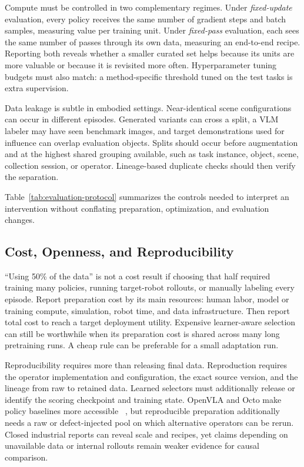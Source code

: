 Compute must be controlled in two complementary regimes.
Under \emph{fixed-update} evaluation, every policy receives the same number of gradient steps and batch samples, measuring value per training unit.
Under \emph{fixed-pass} evaluation, each sees the same number of passes through its own data, measuring an end-to-end recipe.
Reporting both reveals whether a smaller curated set helps because its units are more valuable or because it is revisited more often.
Hyperparameter tuning budgets must also match: a method-specific threshold tuned on the test tasks is extra supervision.

Data leakage is subtle in embodied settings.
Near-identical scene configurations can occur in different episodes.
Generated variants can cross a split, a VLM labeler may have seen benchmark images, and target demonstrations used for influence can overlap evaluation objects.
Splits should occur before augmentation and at the highest shared grouping available, such as task instance, object, scene, collection session, or operator.
Lineage-based duplicate checks should then verify the separation.

Table~\ref{tab:evaluation-protocol} summarizes the controls needed to interpret an intervention without conflating preparation, optimization, and evaluation changes.



\subsection{Cost, Openness, and Reproducibility}

``Using 50\% of the data'' is not a cost result if choosing that half required training many policies, running target-robot rollouts, or manually labeling every episode.
Report preparation cost by its main resources: human labor, model or training compute, simulation, robot time, and data infrastructure.
Then report total cost to reach a target deployment utility.
Expensive learner-aware selection can still be worthwhile when its preparation cost is shared across many long pretraining runs.
A cheap rule can be preferable for a small adaptation run.

Reproducibility requires more than releasing final data.
Reproduction requires the operator implementation and configuration, the exact source version, and the lineage from raw to retained data.
Learned selectors must additionally release or identify the scoring checkpoint and training state.
OpenVLA and Octo make policy baselines more accessible ~\cite{kim2024openvla_2406_09246,team2024octo_2405_12213}, but reproducible preparation additionally needs a raw or defect-injected pool on which alternative operators can be rerun.
Closed industrial reports can reveal scale and recipes, yet claims depending on unavailable data or internal rollouts remain weaker evidence for causal comparison.

